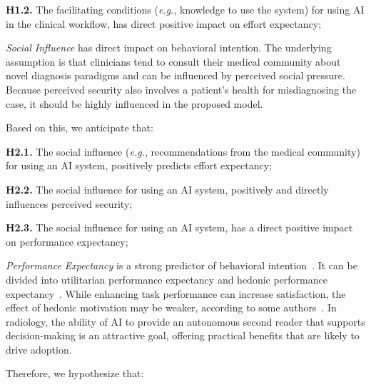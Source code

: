 \noindent
{\bf H1.2.} The facilitating conditions ({\it e.g.}, knowledge to use the system) for using AI in the clinical workflow, has direct positive impact on effort expectancy;

\vspace{2.25mm}

{\it Social Influence} has direct impact on behavioral intention.
The underlying assumption is that clinicians tend to consult their medical community about novel diagnosis paradigms and can be influenced by perceived social pressure.
Because perceived security also involves a patient's health for misdiagnosing the case, it should be highly influenced in the proposed model.

\noindent
Based on this, we anticipate that:

\vspace{2.25mm}

\noindent
{\bf H2.1.} The social influence ({\it e.g.}, recommendations from the medical community) for using an AI system, positively predicts effort expectancy;

\vspace{2.25mm}

\noindent
{\bf H2.2.} The social influence for using an AI system, positively and directly influences perceived security;

\vspace{2.25mm}

\noindent
{\bf H2.3.} The social influence for using an AI system, has a direct positive impact on performance expectancy;

\vspace{2.25mm}

{\it Performance Expectancy} is a strong predictor of behavioral intention~\cite{KHALILZADEH2017460}.
It can be divided into utilitarian performance expectancy and hedonic performance expectancy~\cite{Yang2010}.
While enhancing task performance can increase satisfaction, the effect of hedonic motivation may be weaker, according to some authors~\cite{ESCOBARRODRIGUEZ201470, HART201993}.
In radiology, the ability of AI to provide an autonomous second reader that supports decision-making is an attractive goal, offering practical benefits that are likely to drive adoption.

\vspace{2.25mm}

\noindent
Therefore, we hypothesize that:

\vspace{2.25mm}

